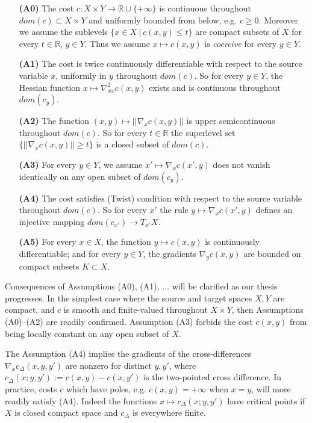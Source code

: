 \documentclass[12pt]{amsart}
\theoremstyle{definition}
\theoremstyle{remark}
\newcommand{\bR}{\mathbb{R}}
\newcommand{\cd}{c_\Delta}
\begin{document}
\begin{itemize}
\item[\textbf{(A0)}] The cost $c:X\times Y \to \bR \cup \{+\infty\}$ is continuous throughout $dom(c) \subset X\times Y$ and uniformly bounded from below, e.g. $c\geq 0$. Moreover we assume the sublevels $\{x\in X~|~ c(x,y) \leq t\}$ are compact subsets of $X$ for every $t\in \bR$, $y\in Y$. Thus we assume $x\mapsto c(x,y)$ is \emph{coercive} for every $y\in Y$.

\item[\textbf{(A1)}] The cost is twice continuously differentiable with respect to the source variable $x$, uniformly in $y$ throughout $dom(c)$. So for every $y\in Y$, the Hessian function $x\mapsto \nabla_{xx}^2 c(x,y)$ exists and is continuous throughout $dom(c_y)$. 

\item[\textbf{(A2)}] The function $(x,y)\mapsto ||\nabla_x c(x,y)||$ is upper semicontinuous throughout $dom(c)$. So for every $t\in \bR$ the superlevel set $\{ ||\nabla_x c(x,y)|| \geq t\}$ is a closed subset of $dom(c)$. 

\item[\textbf{(A3)}] For every $y\in Y$, we assume $x'\mapsto \nabla_x c(x',y)$ does not vanish identically on any open subset of $dom(c_y)$.  

\item[\textbf{(A4)}] The cost satisfies (Twist) condition with respect to the source variable throughout $dom(c)$. So for every $x'$ the rule $y\mapsto \nabla_x c(x',y)$ defines an injective mapping $dom(c_{x'}) \to T_{x'} X$. 

\item[\textbf{(A5)}]\label{A+} For every $x\in X$, the function $y\mapsto c(x,y)$ is continuously differentiable; and for every $y\in Y$, the gradients $\nabla_y c(x,y)$ are bounded on compact subsets $K\subset X$.
\end{itemize}

Consequences of Assumptions (A0), (A1), $\ldots$ will be clarified as our thesis progresses. In the simplest case where the source and target spaces $X,Y$ are compact, and $c$ is smooth and finite-valued throughout $X\times Y$, then Assumptions (A0)--(A2) are readily confirmed. Assumption (A3) forbids the cost $c(x,y)$ from being locally constant on any open subset of $X$. 

The Assumption (A4) implies the gradients of the cross-differences $\nabla_x \cd(x,y,y')$ are nonzero for distinct $y,y'$, where $\cd(x;y, y'):=c(x,y)-c(x,y')$ is the two-pointed cross difference. In practice, costs $c$ which have poles, e.g. $c(x,y)=+\infty$ when $x=y$, will more readily satisfy (A4). Indeed the functions $x\mapsto \cd(x;y, y')$ have critical points if $X$ is closed compact space and $\cd$ is everywhere finite. 
\end{document}
